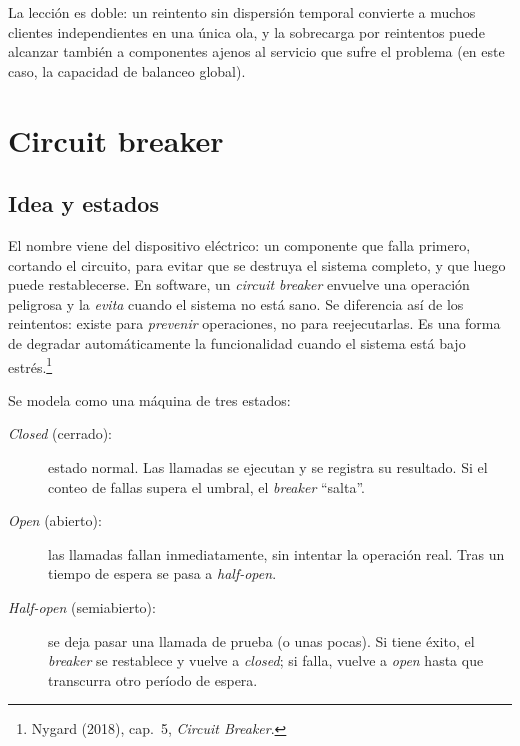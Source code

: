 \documentclass[variant=apuntes,cover=institutional,mode=screen]{ua-engineering-v6-article}
\begin{document}
La lección es doble: un reintento sin dispersión temporal convierte a muchos clientes independientes en una única ola, y la sobrecarga por reintentos puede alcanzar también a componentes ajenos al servicio que sufre el problema (en este caso, la capacidad de balanceo global).

\section{Circuit breaker}\label{sec:breaker}

\subsection{Idea y estados}

El nombre viene del dispositivo eléctrico: un componente que falla primero, cortando el circuito, para evitar que se destruya el sistema completo, y que luego puede restablecerse. En software, un \emph{circuit breaker} envuelve una operación peligrosa y la \emph{evita} cuando el sistema no está sano. Se diferencia así de los reintentos: existe para \emph{prevenir} operaciones, no para reejecutarlas. Es una forma de degradar automáticamente la funcionalidad cuando el sistema está bajo estrés.\footnote{Nygard (2018), cap.~5, \emph{Circuit Breaker}.}

Se modela como una máquina de tres estados:
\begin{description}
\item[\emph{Closed} (cerrado):] estado normal. Las llamadas se ejecutan y se registra su resultado. Si el conteo de fallas supera el umbral, el \emph{breaker} ``salta''.
\item[\emph{Open} (abierto):] las llamadas fallan inmediatamente, sin intentar la operación real. Tras un tiempo de espera se pasa a \emph{half-open}.
\item[\emph{Half-open} (semiabierto):] se deja pasar una llamada de prueba (o unas pocas). Si tiene éxito, el \emph{breaker} se restablece y vuelve a \emph{closed}; si falla, vuelve a \emph{open} hasta que transcurra otro período de espera.
\end{description}
\end{document}
